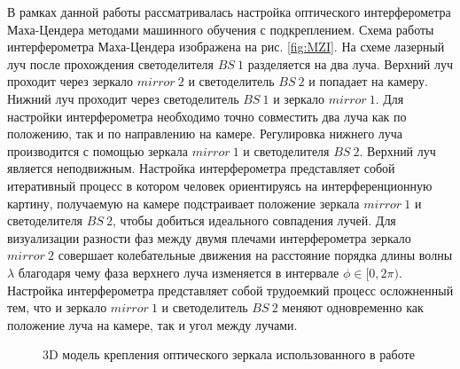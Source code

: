 В рамках данной работы рассматривалась настройка оптического интерферометра Маха-Цендера методами машинного обучения с подкреплением. Схема работы интерферометра Маха-Цендера изображена на рис. \ref{fig:MZI}. На схеме лазерный луч после прохождения светоделителя $BS\ 1$ разделяется на два луча. Верхний луч проходит через зеркало $mirror\ 2$ и светоделитель $BS\ 2$ и попадает на камеру. Нижний луч проходит через светоделитель $BS\ 1$ и зеркало $mirror\ 1$. Для настройки интерферометра необходимо точно совместить два луча как по положению, так и по направлению на камере. Регулировка нижнего луча производится с помощью зеркала $mirror\ 1$ и светоделителя $BS\ 2$. Верхний луч является неподвижным. Настройка интерферометра представляет собой итеративный процесс в котором человек ориентируясь на интерференционную картину, получаемую на камере подстраивает положение зеркала $mirror\ 1$ и светоделителя $BS\ 2$, чтобы добиться идеального совпадения лучей. Для визуализации разности фаз между двумя плечами интерферометра зеркало $mirror\ 2$ совершает колебательные движения на расстояние порядка длины волны $\lambda$ благодаря чему фаза верхнего луча изменяется в интервале $\phi \in [0, 2\pi)$. Настройка интерферометра представляет собой трудоемкий процесс осложненный тем, что и зеркало $mirror\ 1$ и светоделитель $BS\ 2$ меняют одновременно как положение луча на камере, так и угол между лучами. 

\begin{figure}[ht]
\caption{3D модель крепления оптического зеркала использованного в работе \cite{newport_mirror}}
\label{fig:mirror}
\end{figure}


